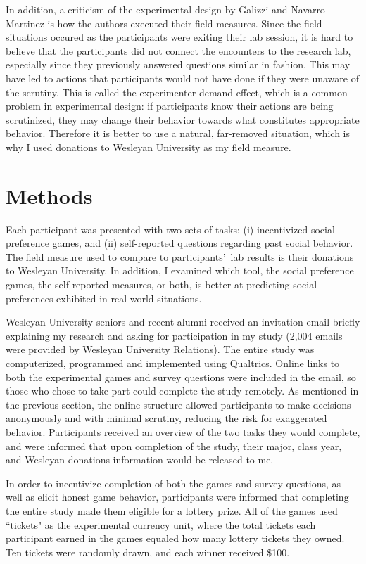 \documentclass[12pt]{article}
\begin{document}
In addition, a criticism of the experimental design by Galizzi and Navarro-Martinez is how the authors executed their field measures. Since the field situations occured as the participants were exiting their lab session, it is hard to believe that the participants did not connect the encounters to the research lab, especially since they previously answered questions similar in fashion. This may have led to actions that participants would not have done if they were unaware of the scrutiny. This is called the experimenter demand effect, which is a common problem in experimental design: if participants know their actions are being scrutinized, they may change their behavior towards what constitutes appropriate behavior. Therefore it is better to use a natural, far-removed situation, which is why I used donations to Wesleyan University as my field measure.

\section{Methods}

Each participant was presented with two sets of tasks: (i) incentivized social preference games, and (ii) self-reported questions regarding past social behavior. The field measure used to compare to participants\rq \ lab results is their donations to Wesleyan University.  In addition, I examined which tool, the social preference games, the self-reported measures, or both, is better at predicting social preferences exhibited in real-world situations.
 
Wesleyan University seniors and recent alumni received an invitation email briefly explaining my research and asking for participation in my study (2,004 emails were provided by Wesleyan University Relations). The entire study was computerized, programmed and implemented using Qualtrics. Online links to both the experimental games and survey questions were included in the email, so those who chose to take part could complete the study remotely. As mentioned in the previous section, the online structure allowed participants to make decisions anonymously and with minimal scrutiny, reducing the risk for exaggerated behavior. Participants received an overview of the two tasks they would complete, and were informed that upon completion of the study, their major, class year, and Wesleyan donations information would be released to me.

In order to incentivize completion of both the games and survey questions, as well as elicit honest game behavior, participants were informed that completing the entire study made them eligible for a lottery prize. All of the games used ``tickets" as the experimental currency unit, where the total tickets each participant earned in the games equaled how many lottery tickets they owned. Ten tickets were randomly drawn, and each winner received \$100.
\end{document}
